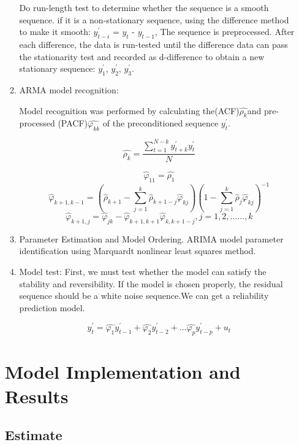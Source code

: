 \documentclass{mcmthesis}
\begin{document}
\begin{enumerate}
\begin{enumerate}
           Do run-length test to determine whether the sequence is a smooth sequence. if it is a non-stationary sequence, using the difference method to make it smooth: $y_{t-i}^{'}$ = $y_{t}$ - $y_{t-1}$, The sequence is preprocessed. After each difference, the data is run-tested until the difference data can pass the stationarity test and recorded as d-difference to obtain a new stationary sequence: $y_{1}^{'}$, $y_{2}^{'}$, $y_{3}^{'}$.

          \item ARMA model recognition:

          Model recognition was performed by calculating the(ACF)$\hat{\rho_{k}}$and pre-processed (PACF)$\hat{\varphi_{kk}}$ of the preconditioned sequence $y_{t}^{'}$.

          $$\hat{\rho_{k}} = \frac{\sum_{t=1}^{N-k}y_{t+k}^{'}y_{t}^{'}}{N}$$

          $$\hat{\varphi}_{11} = \hat{\rho_{1}}$$
          $$\hat{\varphi}_{k+1,k-1} = (\hat{\rho}_{k+1}-\sum_{j=1}^{k}\hat{\rho}_{k+1-j}\hat{\varphi}_{kj})(1-\sum_{j=1}^{k}\hat{\rho}_{j}\hat{\varphi}_{kj})^{-1}$$
          $$\hat{\varphi}_{k+1,j} = \hat{\varphi}_{jk} - \hat{\varphi}_{k+1,k+1}\hat{\varphi}_{k,k+1-j},j = 1, 2, ......, k $$

          \item Parameter Estimation and Model Ordering. ARIMA model parameter identification using Marquardt nonlinear least squares method.

          \item Model test:
          First, we must test whether the model can satisfy the stability and reversibility. If the model is chosen properly, the residual sequence should be a white noise sequence.We can get a reliability prediction model.

          $$y_{t}^{'}=\hat{\varphi_{1}}y_{t-1}^{'}+\hat{\varphi_{2}}y_{t-2}^{'}+...\hat{\varphi_{p}}y_{t-p}^{'}+u_{t}$$


        \end{enumerate}


\section{Model Implementation and Results}

    \subsection{Estimate}


\end{enumerate}
\end{document}
